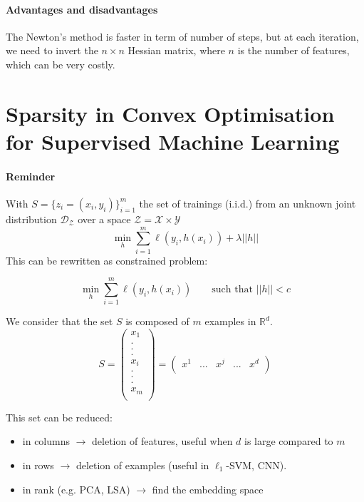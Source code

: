 \documentclass{article}
\begin{document}
\paragraph{Advantages and disadvantages}
The Newton's method is faster in term of number of steps, but at each iteration, we need to invert the $n \times n$ Hessian matrix, where $n$ is the number of features, which can be very costly.


\section{Sparsity in Convex Optimisation for Supervised Machine Learning}


\paragraph{Reminder}
With $S=\{z_i = (x_i,y_i)\}_{i=1}^m$ the set of trainings (i.i.d.) from an unknown joint distribution $\mathcal{D}_\mathcal{Z}$ over a space $\mathcal{Z}=\mathcal{X}\times  \mathcal{Y}$
\[\min_{h} \sum_{i=1}^m \ell (y_i,h(x_i))+\lambda||h||\]
This can be rewritten as constrained problem:

\[\min_{h} \sum_{i=1}^m \ell (y_i,h(x_i))\qquad \text{such that } ||h||<c\]
\bigskip

We consider that the set $S$ is composed of $m$ examples in $\mathbb{R}^d$.
\[
S = \begin{pmatrix}
x_1\\
.\\
.\\
.\\
x_i\\
.\\
.\\
.\\
x_m\\
\end{pmatrix}
=
\begin{pmatrix}
x^1& ... & x^j & ... & x^d
\\\end{pmatrix}
\]


This set can be reduced:
\begin{itemize}
\item in columns $\to$ deletion of features, useful when $d$ is large compared to $m$
\item in rows $\to$ deletion of examples (useful in $\ell_1$-SVM, CNN).
\item in rank (e.g. PCA, LSA) $\to$ find the embedding space
\end{itemize}
\end{document}
